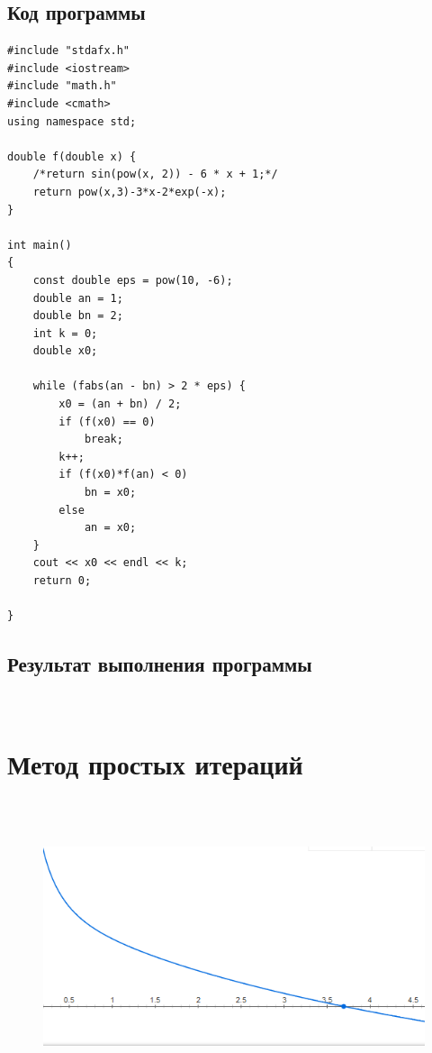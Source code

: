 \documentclass[12pt,a4paper]{article}
\begin{document}
\subsection{Код программы}
\begin{verbatim}
#include "stdafx.h"
#include <iostream>
#include "math.h"
#include <cmath>
using namespace std;

double f(double x) {
	/*return sin(pow(x, 2)) - 6 * x + 1;*/
	return pow(x,3)-3*x-2*exp(-x);
}

int main()
{
	const double eps = pow(10, -6);
	double an = 1;
	double bn = 2;
	int k = 0;
	double x0;

	while (fabs(an - bn) > 2 * eps) {
		x0 = (an + bn) / 2;
		if (f(x0) == 0)
			break;
		k++;
		if (f(x0)*f(an) < 0)
			bn = x0;
		else
			an = x0;
	}
	cout << x0 << endl << k;
	return 0;

}
\end{verbatim}
\subsection{Результат выполнения программы}
\\
\section{Метод простых итераций}
\\\\
\vspace {8cm}
\begin{figure}[h]
\includegraphics[width=\linewidth]{pic2.PNG}
\caption{}
\label{fig:}
\end{figure}
\end{document}
